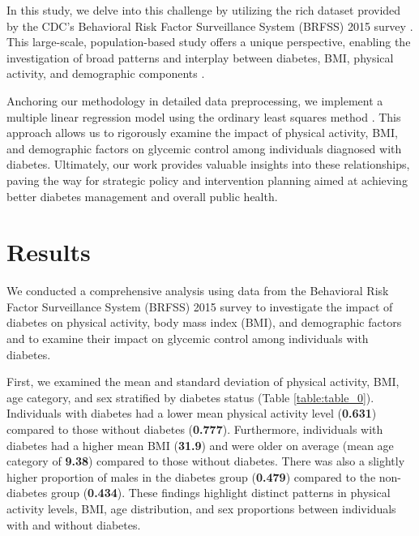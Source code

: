 \documentclass[11pt]{article}
\begin{document}
In this study, we delve into this challenge by utilizing the rich dataset provided by the CDC's Behavioral Risk Factor Surveillance System (BRFSS) 2015 survey \cite{Kato2015DiagnosedDA, Luo2007BodyMI}. This large-scale, population-based study offers a unique perspective, enabling the investigation of broad patterns and interplay between diabetes, BMI, physical activity, and demographic components \cite{Kato2015DiagnosedDA, Pitasi2017HIVTA}.

Anchoring our methodology in detailed data preprocessing, we implement a multiple linear regression model using the ordinary least squares method \cite{Robinson1991SomeSR, Faraway2014LinearMW}. This approach allows us to rigorously examine the impact of physical activity, BMI, and demographic factors on glycemic control among individuals diagnosed with diabetes. Ultimately, our work provides valuable insights into these relationships, paving the way for strategic policy and intervention planning aimed at achieving better diabetes management and overall public health.

\section*{Results}

We conducted a comprehensive analysis using data from the Behavioral Risk Factor Surveillance System (BRFSS) 2015 survey to investigate the impact of diabetes on physical activity, body mass index (BMI), and demographic factors and to examine their impact on glycemic control among individuals with diabetes.

First, we examined the mean and standard deviation of physical activity, BMI, age category, and sex stratified by diabetes status (Table \ref{table:table_0}). Individuals with diabetes had a lower mean physical activity level (\textbf{0.631}) compared to those without diabetes (\textbf{0.777}). Furthermore, individuals with diabetes had a higher mean BMI (\textbf{31.9}) and were older on average (mean age category of \textbf{9.38}) compared to those without diabetes. There was also a slightly higher proportion of males in the diabetes group (\textbf{0.479}) compared to the non-diabetes group (\textbf{0.434}). These findings highlight distinct patterns in physical activity levels, BMI, age distribution, and sex proportions between individuals with and without diabetes.
\end{document}
